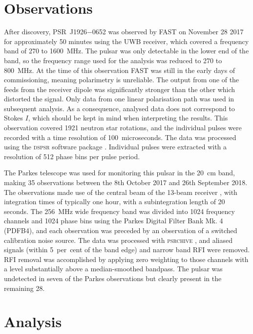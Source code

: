 \section{Observations}
\label{sec: J1926 - observations}
After discovery, PSR~J1926$-$0652 was observed by FAST on November 28 2017 for approximately 50 minutes using the UWB receiver, which covered a frequency band of 270 to 1600~MHz. The pulsar was only detectable in the lower end of the band, so the frequency range used for the analysis was reduced to 270 to 800~MHz. At the time of this observation FAST was still in the early days of commissioning, meaning polarimetry is unreliable. The output from one of the feeds from the receiver dipole was significantly stronger than the other which distorted the signal. Only data from one linear polarisation path was used in subsequent analysis. As a consequence, analysed data does not correspond to Stokes $I$, which should be kept in mind when interpreting the results. This observation covered 1921 neutron star rotations, and the individual pulses were recorded with a time resolution of 100~microseconds. The data was processed using the \textsc{dspsr} software package \citep{SBxx2011}. Individual pulses were extracted with a resolution of 512 phase bins per pulse period.

The Parkes telescope was used for monitoring this pulsar in the 20~cm band, making 35 observations between the 8th October 2017 and 26th September 2018. The observations made use of the central beam of the 13-beam receiver \citep{SWB+1996}, with integration times of typically one hour, with a subintegration length of 20 seconds. The 256~MHz wide frequency band was divided into 1024 frequency channels and 1024 phase bins using the Parkes Digital Filter Bank Mk. 4 (PDFB4), and each observation was preceded by an observation of a switched calibration noise source. The data was processed with \textsc{psrchive} \citep{HSMx2004}, and aliased signals (within 5~per~cent of the band edge) and narrow band RFI were removed. RFI removal was accomplished by applying zero weighting to those channels with a level substantially above a median-smoothed bandpass. The pulsar was undetected in seven of the Parkes observations but clearly present in the remaining 28.

\section{Analysis}
\label{sec: J1926 - analysis}

